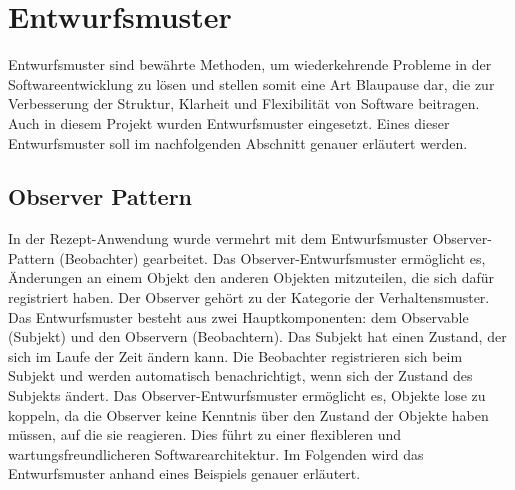 \chapter{Entwurfsmuster}
Entwurfsmuster sind bewährte Methoden, um wiederkehrende Probleme in der Softwareentwicklung zu lösen und stellen somit eine Art Blaupause dar, die zur Verbesserung der Struktur, Klarheit und Flexibilität von Software beitragen. Auch in diesem Projekt wurden Entwurfsmuster eingesetzt. Eines dieser Entwurfsmuster soll im nachfolgenden Abschnitt genauer erläutert werden.

\section{Observer Pattern}
In der Rezept-Anwendung wurde vermehrt mit dem Entwurfsmuster Observer-Pattern (Beobachter) gearbeitet. Das Observer-Entwurfsmuster ermöglicht es, Änderungen an einem Objekt den anderen Objekten mitzuteilen, die sich dafür registriert haben. Der Observer gehört zu der Kategorie der Verhaltensmuster. Das Entwurfsmuster besteht aus zwei Hauptkomponenten: dem Observable (Subjekt) und den Observern (Beobachtern). 
Das Subjekt hat einen Zustand, der sich im Laufe der Zeit ändern kann. Die Beobachter registrieren sich beim Subjekt und werden automatisch benachrichtigt, wenn sich der Zustand des Subjekts ändert. Das Observer-Entwurfsmuster ermöglicht es, Objekte lose zu koppeln, da die Observer keine Kenntnis über den Zustand der Objekte haben müssen, auf die sie reagieren. Dies führt zu einer flexibleren und wartungsfreundlicheren Softwarearchitektur.
Im Folgenden wird das Entwurfsmuster anhand eines Beispiels genauer erläutert.